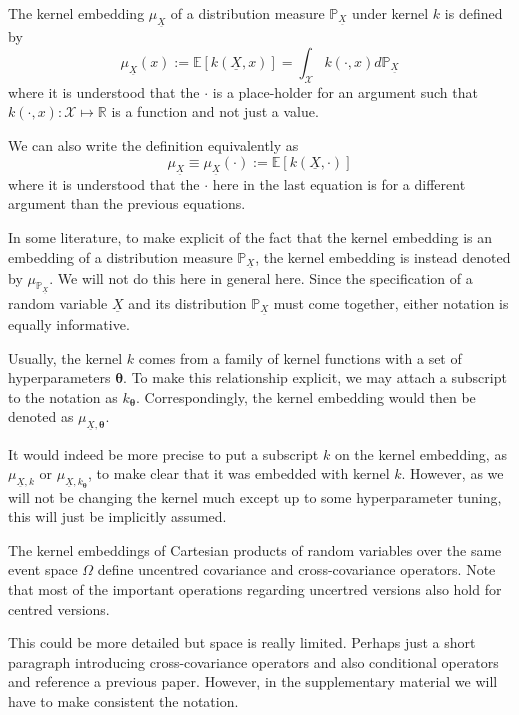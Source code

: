 \documentclass[twoside]{article} \usepackage{aistats2017}
\theoremstyle{definition}
\theoremstyle{remark}
\newcommand{\rv}[1]{\underline{#1}}
\newcommand{\warn}[1]{{\color{RedOrange} #1}}
\newcommand{\extra}[1]{{\color{ForestGreen} #1}}
\begin{document}
		The kernel embedding $\mu_{\rv{X}}$ of a distribution measure $\mathbb{P}_{\rv{X}}$ under kernel $k$ is defined by
		\begin{equation}
			\mu_{\rv{X}}(x) := \mathbb{E}[k(\rv{X}, x)] = \int_{\mathcal{X}} k(\cdot, x) d \mathbb{P}_{\rv{X}}
		\label{eq:basic_embedding}
		\end{equation}
		\extra{where it is understood that the $\cdot$ is a place-holder for an argument such that $k(\cdot, x) : \mathcal{X} \mapsto \mathbb{R}$ is a function and not just a value.}
		
		We can also write the definition equivalently as
		\begin{equation}
			\mu_{\rv{X}} \equiv \mu_{\rv{X}}(\cdot) := \mathbb{E}[k(\rv{X}, \cdot)]
		\label{eq:basic_embedding_alternative}
		\end{equation}
		\extra{where it is understood that the $\cdot$ here in the last equation is for a different argument than the previous equations.}
		 
		\extra{In some literature, to make explicit of the fact that the kernel embedding is an embedding of a distribution measure $\mathbb{P}_{\rv{X}}$, the kernel embedding is instead denoted by $\mu_{\mathbb{P}_{\rv{X}}}$. We will not do this here in general here. Since the specification of a random variable $\rv{X}$ and its distribution $\mathbb{P}_{\rv{X}}$ must come together, either notation is equally informative.}
		 
		Usually, the kernel $k$ comes from a family of kernel functions with a set of hyperparameters $\bm{\theta}$. To make this relationship explicit, we may attach a subscript to the notation as $k_{\bm{\theta}}$. Correspondingly, the kernel embedding would then be denoted as $\mu_{\rv{X}, \bm{\theta}}$.

		\extra{It would indeed be more precise to put a subscript $k$ on the kernel embedding, as $\mu_{\rv{X}, k}$ or $\mu_{\rv{X}, k_{\bm{\theta}}}$, to make clear that it was embedded with kernel $k$. However, as we will not be changing the kernel much except up to some hyperparameter tuning, this will just be implicitly assumed.}
			 
		\extra{The kernel embeddings of Cartesian products of random variables over the same event space $\Omega$ define uncentred covariance and cross-covariance operators. Note that most of the important operations regarding uncertred versions also hold for centred versions.}
		 
		\warn{This could be more detailed but space is really limited. Perhaps just a short paragraph introducing cross-covariance operators and also conditional operators and reference a previous paper. However, in the supplementary material we will have to make consistent the notation.}
\end{document}
